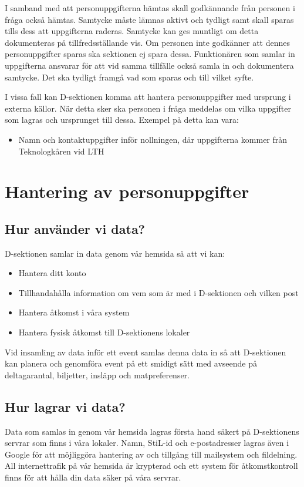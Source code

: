\documentclass{dsekprotokoll}
\begin{document}
I samband med att personuppgifterna hämtas skall godkännande från personen i fråga också hämtas. Samtycke måste lämnas aktivt och tydligt samt skall sparas tills dess att uppgifterna raderas. Samtycke kan ges muntligt om detta dokumenteras på tillfredsställande vis. Om personen inte godkänner att dennes personuppgifter sparas ska sektionen ej spara dessa. Funktionären som samlar in uppgifterna ansvarar för att vid samma tillfälle också samla
in och dokumentera samtycke. Det ska tydligt framgå vad som sparas och till vilket syfte.

I vissa fall kan D-sektionen komma att hantera personuppgifter med ursprung i externa källor. När detta sker ska personen i fråga meddelas om vilka uppgifter som lagras och ursprunget till dessa. Exempel på detta kan vara:

\begin{itemize}
    \item Namn och kontaktuppgifter inför nollningen, där uppgifterna kommer från Teknologkåren vid LTH
\end{itemize}



\section{Hantering av personuppgifter}
\subsection{Hur använder vi data?}
D-sektionen samlar in data genom vår hemsida så att vi kan:
\begin{itemize}
    \item Hantera ditt konto
    \item Tillhandahålla information om vem som är med i D-sektionen och vilken post
    \item Hantera åtkomst i våra system
    \item Hantera fysisk åtkomst till D-sektionens lokaler
\end{itemize}

Vid insamling av data inför ett event samlas denna data in så att D-sektionen kan planera och genomföra event på ett smidigt sätt med avseende på deltagarantal, biljetter, insläpp och matpreferenser.

\subsection{Hur lagrar vi data?}
Data som samlas in genom vår hemsida lagras första hand säkert på D-sektionens servrar som finns i våra lokaler. Namn, StiL-id och e-postadresser lagras även i
Google för att möjliggöra hantering av och tillgång till mailsystem och fildelning. All internettrafik på vår hemsida är krypterad och ett system för åtkomstkontroll finns för att hålla din data säker på våra servrar.
\end{document}
